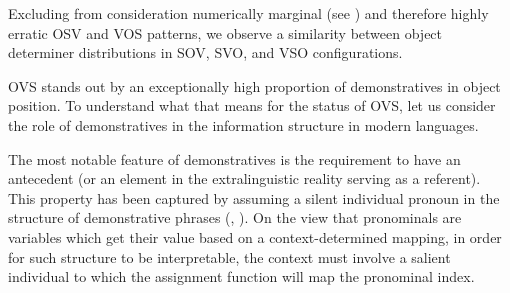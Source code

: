 \documentclass[output=paper,modfonts,nonflat]{langsci/langscibook}
\begin{document}

Excluding from consideration numerically marginal (see ) and therefore highly erratic OSV and VOS patterns, we observe a similarity between object determiner distributions in SOV, SVO, and VSO configurations. 





OVS stands out by an exceptionally high proportion of demonstratives in object position. To understand what that means for the status of OVS, let us consider the role of demonstratives in the information structure in modern languages. 

The most notable feature of demonstratives is the requirement to have an antecedent (or an element in the extralinguistic reality serving as a referent). This property has been captured by assuming a silent individual pronoun in the structure of demonstrative phrases (\citealt{Nunberg:1993}, \citealt{Elbourne:2008}). On the view that pronominals are variables which get their value based on a context-determined mapping, in order for such structure to be interpretable, the context must involve a salient individual to which the assignment function will map the pronominal index. 
\end{document}
